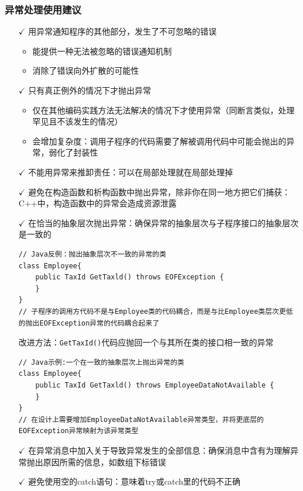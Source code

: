 \subsubsection{异常处理使用建议}
\begin{itemize}[leftmargin=1em]
    \item[$\checkmark$] 用异常通知程序的其他部分，发生了不可忽略的错误
    \begin{itemize}
        \item 能提供一种无法被忽略的错误通知机制
        \item 消除了错误向外扩散的可能性
    \end{itemize}
    \item[$\checkmark$] 只有真正例外的情况下才抛出异常
    \begin{itemize}
        \item 仅在其他编码实践方法无法解决的情况下才使用异常（同断言类似，处理罕见且不该发生的情况）
        \item 会增加复杂度：调用子程序的代码需要了解被调用代码中可能会抛出的异常，弱化了封装性
    \end{itemize}
    \item[$\checkmark$] 不能用异常来推卸责任：可以在局部处理就在局部处理掉
    \item[$\checkmark$] 避免在构造函数和析构函数中抛出异常，除非你在同一地方把它们捕获：C++中，构造函数中的异常会造成资源泄露
    \item[$\checkmark$] 在恰当的抽象层次抛出异常：确保异常的抽象层次与子程序接口的抽象层次是一致的
    \begin{lstlisting}
// Java反例：抛出抽象层次不一致的异常的类
class Employee{
    public TaxId GetTaxld() throws EOFException {
    }
}
// 子程序的调用方代码不是与Employee类的代码耦合，而是与比Employee类层次更低的抛出EOFException异常的代码耦合起来了
    \end{lstlisting}
    改进方法：\verb|GetTaxId()|\;代码应抛回一个与其所在类的接口相一致的异常
    \begin{lstlisting}
// Java示例:一个在一致的抽象层次上抛出异常的类
class Employee{
    public TaxId GetTaxld() throws EmployeeDataNotAvailable {
    }
} 
// 在设计上需要增加EmployeeDataNotAvailable异常类型，并将更底层的EOFException异常映射为该异常类型
    \end{lstlisting}
    \item[$\checkmark$] 在异常消息中加入关于导致异常发生的全部信息：确保消息中含有为理解异常抛出原因所需的信息，如数组下标错误
    \item[$\checkmark$] 避免使用空的catch语句：意味着try或catch里的代码不正确

\end{itemize}
